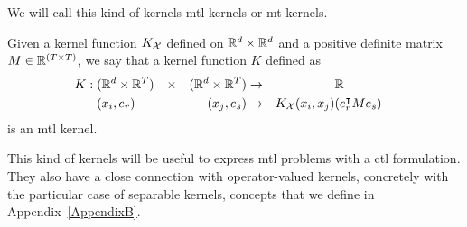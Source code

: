 We will call this kind of kernels \acrshort{mtl} kernels or \acrshort{mt} kernels.
\begin{definition}\label{def:mtl_kernel}
    Given a kernel function $K_{\mathcal{X}}$ defined on $\mathbb{R}^d \times \mathbb{R}^d$ and a positive definite matrix $M \in \mathbb{R}^{(T \times T)}$, 
    we say that a kernel function $K$ defined as
    \begin{equation}
        \nonumber
        \begin{aligned}
            K:\; & (\mathbb{R}^d \times \mathbb{R}^T) & \times &  & (\mathbb{R}^d \times \mathbb{R}^T) & \to &                     & \mathbb{R}              &   \\
                             & (x_i, e_r)                  &        &  & (x_j , e_s)      & \to & K_{\mathcal{X}}(x_i, x_j) & (e_r^\intercal M e_s) & 
        \end{aligned}
    \end{equation}
    is an \acrshort{mtl} kernel.
\end{definition}
%
This kind of kernels will be useful to express \acrshort{mtl} problems with a \acrshort{ctl} formulation.
%
They also have a close connection with operator-valued kernels, concretely with the particular case of separable kernels, concepts that we define in Appendix~\ref{AppendixB}.

